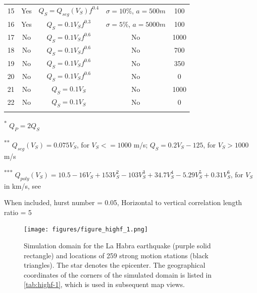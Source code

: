 \begin{table}[!ht]
\begin{threeparttable}
{\begin{tabular}{@{}ccccc@{}}
        15       & Yes        & $Q_S=Q_{seg}(V_S)f^{0.4}$\tnote{\textsuperscript{**}}        & $\sigma=10\%$, $a=500m$ & 100\\
        16        & Yes        & $Q_S=0.1V_Sf^{0.3}$              & $\sigma=5\%$, $a=5000m$ & 100\\
        17       & No         & $Q_S=0.1V_Sf^{0.6}$               & No                     & 1000  \\
        18       & No         & $Q_S=0.1V_Sf^{0.6}$               & No                     & 700\\
        19       & No         & $Q_S=0.1V_Sf^{0.6}$               & No                     & 350\\
        20       & No         & $Q_S=0.1V_Sf^{0.6}$               & No                     & 0  \\
        21       & No         & $Q_S=0.1V_S$                      & No                     & 1000  \\
        22       & No         & $Q_S=0.1V_S$                      & No                     & 0  \\\bottomrule
        \\[-5mm]
      \end{tabular}%
    }
    \begin{tablenotes}
      \item[\textsuperscript{*}] \footnotesize $Q_P=2Q_S$\\[-6pt]
      \item[\textsuperscript{**}] \footnotesize $Q_{seg}(V_S)=0.075V_S$, for $V_S <= 1000$ m/s; $Q_S=0.2V_S - 125$, for $V_S > 1000$ m/s\\[-3pt]
      \item[\textsuperscript{***}] \footnotesize $Q_{poly}(V_S)=10.5 - 16V_S + 153V_S^2 - 103V_S^3 + 34.7V_S^4 - 5.29V_S^5 + 0.31V_S^6$, for $V_S$ in km/s, see \citet{taborda2014ground}\\[-4pt]
      \item[\textdagger] \footnotesize When included, hurst number = 0.05, Horizontal to vertical correlation length ratio = 5
    \end{tablenotes}
  \end{threeparttable}
\end{table}
\clearpage


\begin{figure}[!ht]
  \centering
  \texttt{[image: figures/figure\_highf\_1.png]}
  \caption{Simulation domain for the La Habra earthquake (purple solid rectangle) and locations of 259 strong motion stations (black triangles). The star denotes the epicenter. The geographical coordinates of the corners of the simulated domain is listed in \cref{tab:highf-1}, which is used in subsequent map views.}
  \label{fig:highf-1}
\end{figure}
\clearpage

